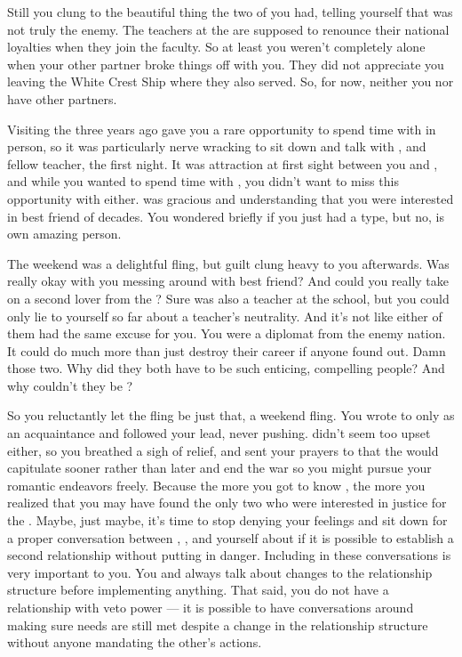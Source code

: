 \documentclass[char]{GL2020}
\begin{document}
Still you clung to the beautiful thing the two of you had, telling yourself that \cBeetle{} was not truly the enemy. The teachers at the \pSc{} are supposed to renounce their national loyalties when they join the faculty. So at least you weren’t completely alone when your other partner broke things off with you. They did not appreciate you leaving the White Crest Ship where they also served. So, for now, neither you nor \cBeetle{} have other partners.

Visiting the \pSchool{} three years ago gave you a rare opportunity to spend time with \cBeetle{} in person, so it was particularly nerve wracking to sit down and talk with \cBeetle{}, and \cBeetle{\their} fellow teacher, \cEthics{} the first night. It was attraction at first sight between you and \cEthics{}, and while you wanted to spend time with \cBeetle{}, you didn’t want to miss this opportunity with \cEthics{} either. \cBeetle{} was gracious and understanding that you were interested in \cBeetle{\their} best friend of decades. You wondered briefly if you just had a type, but no, \cEthics{} is \cEthics{\their} own amazing person. 

The weekend was a delightful fling, but guilt clung heavy to you afterwards. Was \cBeetle{} really okay with you messing around with \cBeetle{\their} best friend? And could you really take on a second lover from the \pTech{}? Sure \cEthics{} was also a teacher at the school, but you could only lie to yourself so far about a teacher’s neutrality. And it’s not like either of them had the same excuse for you. You were a diplomat from the enemy nation. It could do much more than just destroy their career if anyone found out. Damn those two. Why did they both have to be such enticing, compelling people? And why couldn’t they be \pShippies{}?

So you reluctantly let the fling be just that, a weekend fling. You wrote to \cEthics{} only as an acquaintance and \cEthics{\they} followed your lead, never pushing. \cBeetle{} didn’t seem too upset either, so you breathed a sigh of relief, and sent your prayers to \cEbb{} that the \pTech{} would capitulate sooner rather than later and end the war so you might pursue your romantic endeavors freely. Because the more you got to know \cEthics{}, the more you realized that you may have found the only two \pTechies{} who were interested in justice for the \pShip{}. Maybe, just maybe, it’s time to stop denying your feelings and sit down for a proper conversation between \cBeetle{}, \cEthics{}, and yourself about if it is possible to establish a second relationship without putting \cEthics{} in danger. Including \cBeetle{} in these conversations is very important to you. You and \cBeetle{} always talk about changes to the relationship structure before implementing anything. That said, you do not have a relationship with veto power — it is possible to have conversations around making sure needs are still met despite a change in the relationship structure without anyone mandating the other's actions. 
\end{document}
